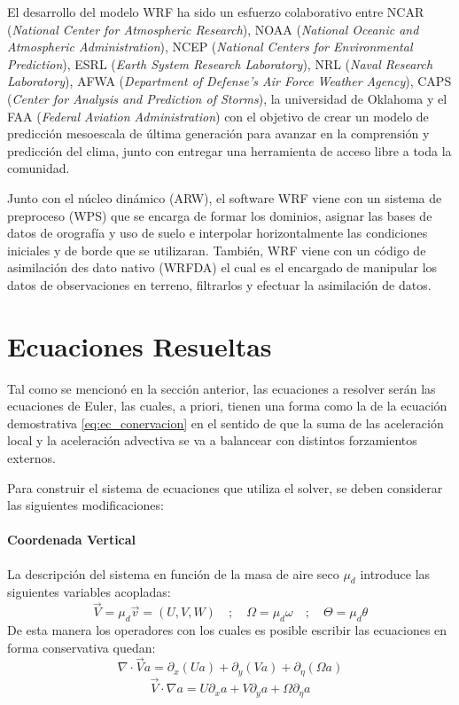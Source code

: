 El desarrollo del modelo WRF ha sido un esfuerzo colaborativo entre NCAR (\emph{National Center for Atmospheric Research}), NOAA (\emph{National Oceanic and Atmospheric Administration}), NCEP (\emph{National Centers for Environmental Prediction}), ESRL (\emph{Earth System Research Laboratory}), NRL (\emph{Naval Research Laboratory}), AFWA (\emph{Department of Defense's Air Force Weather Agency}), CAPS (\emph{Center for Analysis and Prediction of Storms}), la universidad de Oklahoma y el FAA (\emph{Federal Aviation Administration}) con el objetivo de crear un modelo de predicción mesoescala de última generación para avanzar en la comprensión y predicción del clima, junto con entregar una herramienta de acceso libre a toda la comunidad.

Junto con el núcleo dinámico (ARW), el software WRF viene con un sistema de preproceso (WPS) que se encarga de formar los dominios, asignar las bases de datos de orografía y uso de suelo e interpolar horizontalmente las condiciones iniciales y de borde que se utilizaran. También, WRF viene con un código de asimilación des dato nativo (WRFDA) el cual es el encargado de manipular los datos de observaciones en terreno, filtrarlos y efectuar la asimilación de datos.
 
\newpage
\section{Ecuaciones Resueltas}
Tal como se mencionó en la sección anterior, las ecuaciones a resolver serán las ecuaciones de Euler, las cuales, a priori, tienen una forma como la de la ecuación demostrativa \ref{eq:ec_conervacion} en el sentido de que la suma de las aceleración local y la aceleración advectiva se va a balancear con distintos forzamientos externos.

Para construir el sistema de ecuaciones que utiliza el solver, se deben considerar las siguientes modificaciones:
\paragraph{Coordenada Vertical} La descripción del sistema en función de la masa de aire seco $\mu_d$ introduce las siguientes variables acopladas:
\begin{equation}
\vec{V}=\mu_d\vec{v}=(U,V,W)\quad;\quad \Omega = \mu_d \omega \quad;\quad \Theta = \mu_d \theta
\end{equation}
De esta manera los operadores con los cuales es posible escribir las ecuaciones en forma conservativa quedan:
\begin{equation}
\nabla\cdot\vec{V}a = \partial_x(Ua)+\partial_y(Va)+\partial_\eta (\Omega a)
\end{equation}
\begin{equation}
\vec{V}\cdot \nabla a = U\partial_x a + V\partial_y a + \Omega\partial_\eta a
\end{equation}
